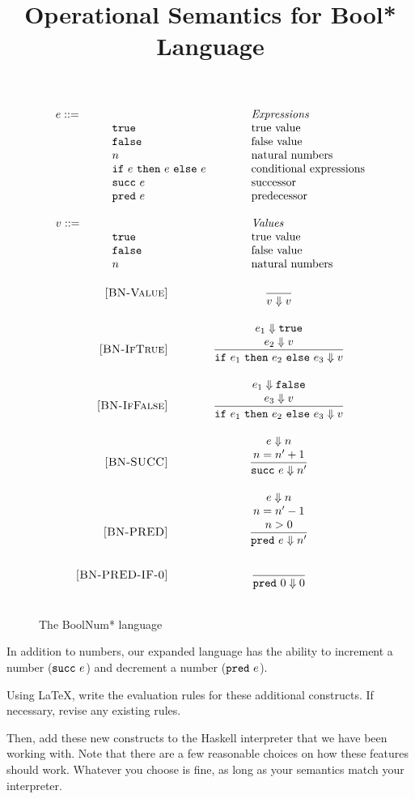 \documentclass{article}
\makeatletter
\newcommand{\mydefhead}[2]{\multicolumn{2}{l}{{#1}}&\mbox{\emph{#2}}\\}
\newcommand{\mydefcase}[2]{\qquad\qquad& #1 &\mbox{#2}\\}
\newcommand{\true}{\mbox{\tt true}}
\newcommand{\false}{\mbox{\tt false}}\title{Operational Semantics for Bool* Language}
\newcommand{\ife}[3]{\mbox{\tt if}~{#1}~\mbox{\tt then}~{#2}~\mbox{\tt else}~{#3}}
\newcommand{\suc}[1]{\mbox{\tt succ}~{#1}}
\newcommand{\prd}[1]{\mbox{\tt pred}~{#1}}
\newcommand{\bstep}[2]{{#1} \Downarrow {#2}}
\newcommand{\rel}[1]{ \mbox{\sc [#1]} }
\newcommand{\bsrule}[3]{
  \rel{#1} &
  \frac{\strut\begin{array}{@{}c@{}} #2 \end{array}}
       {\strut\begin{array}{@{}c@{}} #3 \end{array}}
   \\~\\
}
\makeatother
\begin{document}
\begin{figure}
\caption{The BoolNum* language}
\label{fig:lang2}
\[
  \begin{array}{ll@{\qquad\qquad}l}
  \mydefhead{e ::=\qquad\qquad\qquad\qquad}{Expressions}
  \mydefcase{\true}{true value}
  \mydefcase{\false}{false value}
  \mydefcase{n}{natural numbers}
  \mydefcase{\ife e e e}{conditional expressions}
  \mydefcase{\suc e}{successor}
  \mydefcase{\prd e}{predecessor}
  \\
  \mydefhead{v ::=\qquad\qquad\qquad\qquad}{Values}
  \mydefcase{\true}{true value}
  \mydefcase{\false}{false value}
  \mydefcase{n}{natural numbers}
\end{array}
\]
\[
\begin{array}{r@{\qquad\qquad}c}
\bsrule{BN-Value}{}{
  \bstep{v}{v}
}
\bsrule{BN-IfTrue}{
  \bstep{e_1}{\true} \\
  \bstep{e_2}{v}
}{
  \bstep{\ife{e_1}{e_2}{e_3}}{v}
}
\bsrule{BN-IfFalse}{
  \bstep{e_1}{\false} \\
  \bstep{e_3}{v}
}{
  \bstep{\ife{e_1}{e_2}{e_3}}{v}
}
\bsrule{BN-SUCC}{
  \bstep{e}{n} \\
  n = n'+1 
}{
  \bstep{\suc{e}}{n'}
}
\bsrule{BN-PRED}{
  \bstep{e}{n} \\
  n = n'-1  \\
  n > 0
}{
  \bstep{\prd{e}}{n'}
}
\bsrule{BN-PRED-IF-0}{}{
  \bstep{\prd{0}}{0}
}
\end{array}
\]
\end{figure}

In addition to numbers, our expanded language has the ability to increment a number ($\suc e$)
and decrement a number ($\prd e$).

Using LaTeX, write the evaluation rules for these additional constructs.
If necessary, revise any existing rules.

Then, add these new constructs to the Haskell interpreter that we have been working with.
Note that there are a few reasonable choices on how these features should work.
Whatever you choose is fine, as long as your semantics match your interpreter.
\end{document}
